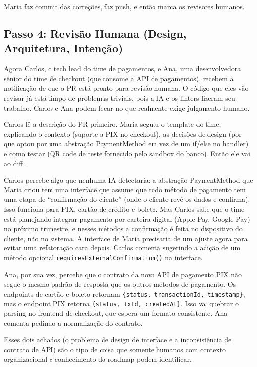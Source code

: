 Maria faz commit das correções, faz push, e então marca os revisores humanos.

\subsection{Passo 4: Revisão Humana (Design, Arquitetura, Intenção)}

Agora Carlos, o tech lead do time de pagamentos, e Ana, uma desenvolvedora sênior do
time de checkout (que consome a API de pagamentos), recebem a notificação de que o PR
está pronto para revisão humana. O código que eles vão revisar já está limpo de
problemas triviais, pois a IA e os linters fizeram seu trabalho. Carlos e Ana podem
focar no que realmente exige julgamento humano.

Carlos lê a descrição do PR primeiro. Maria seguiu o template do time, explicando
o contexto (suporte a PIX no checkout), as decisões de design (por que optou por
uma abstração PaymentMethod em vez de um if/else no handler) e como testar (QR code
de teste fornecido pelo sandbox do banco). Então ele vai ao diff.

Carlos percebe algo que nenhuma IA detectaria: a abstração PaymentMethod que Maria
criou tem uma interface que assume que todo método de pagamento tem uma etapa de
``confirmação do cliente'' (onde o cliente revê os dados e confirma). Isso funciona
para PIX, cartão de crédito e boleto. Mas Carlos sabe que o time está planejando
integrar pagamento por carteira digital (Apple Pay, Google Pay) no próximo trimestre,
e nesses métodos a confirmação é feita no dispositivo do cliente, não no sistema.
A interface de Maria precisaria de um ajuste agora para evitar uma refatoração cara
depois. Carlos comenta sugerindo a adição de um método opcional
\texttt{requiresExternalConfirmation()} na interface.

Ana, por sua vez, percebe que o contrato da nova API de pagamento PIX não segue o
mesmo padrão de resposta que os outros métodos de pagamento. Os endpoints de cartão
e boleto retornam \texttt{\{status, transactionId, timestamp\}}, mas o endpoint PIX
retorna \texttt{\{status, txId, createdAt\}}. Isso vai quebrar o parsing no frontend
de checkout, que espera um formato consistente. Ana comenta pedindo a normalização
do contrato.

Esses dois achados (o problema de design de interface e a inconsistência de contrato
de API) são o tipo de coisa que somente humanos com contexto
organizacional e conhecimento do roadmap podem identificar.

